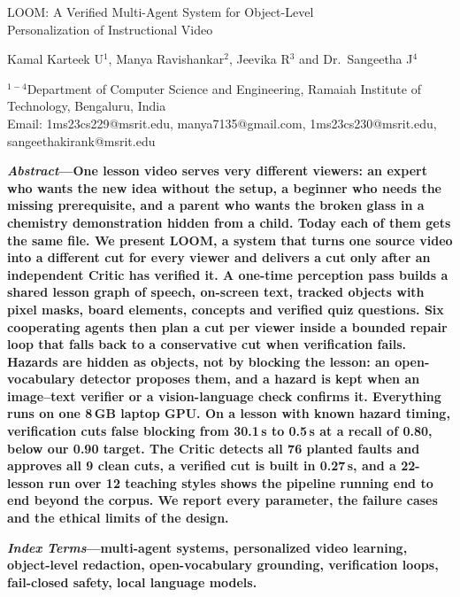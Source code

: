 \documentclass[9pt,a4paper]{extarticle}
\begin{document}
\begin{center}
{\fontsize{20}{24}\selectfont LOOM: A Verified Multi-Agent System for Object-Level\\ Personalization of Instructional Video\par}
\vspace{10pt}
{\fontsize{10}{12}\selectfont Kamal Karteek U$^1$, Manya Ravishankar$^2$, Jeevika R$^3$ and Dr.\ Sangeetha J$^4$\par}
\vspace{2pt}
{\fontsize{9}{11}\selectfont $^{1-4}$Department of Computer Science and Engineering, Ramaiah Institute of Technology, Bengaluru, India\\
Email: 1ms23cs229@msrit.edu, manya7135@gmail.com, 1ms23cs230@msrit.edu, sangeethakirank@msrit.edu\par}
\end{center}
\vspace{6pt}

\begin{list}{}{\leftmargin=1.1cm\rightmargin=1.1cm}\item\relax
\textbf{\textit{Abstract}---One lesson video serves very different viewers: an expert who wants the new idea without
the setup, a beginner who needs the missing prerequisite, and a parent who wants the broken glass in a chemistry
demonstration hidden from a child. Today each of them gets the same file. We present LOOM, a system that turns one
source video into a different cut for every viewer and delivers a cut only after an independent Critic has verified it.
A one-time perception pass builds a shared lesson graph of speech, on-screen text, tracked objects with pixel masks,
board elements, concepts and verified quiz questions. Six cooperating agents then plan a cut per viewer inside a
bounded repair loop that falls back to a conservative cut when verification fails. Hazards are hidden as objects, not
by blocking the lesson: an open-vocabulary detector proposes them, and a hazard is kept when an image--text verifier
or a vision-language check confirms it. Everything runs on one 8\,GB laptop GPU. On a lesson with known hazard timing,
verification cuts false blocking from 30.1\,s to 0.5\,s at a recall of 0.80, below our 0.90 target. The Critic detects
all 76 planted faults and approves all 9 clean cuts, a verified cut is built in 0.27\,s, and a 22-lesson run over 12
teaching styles shows the pipeline running end to end beyond the corpus. We report every parameter, the failure cases
and the ethical limits of the design.}

\vspace{6pt}
\textbf{\textit{Index Terms}---multi-agent systems, personalized video learning, object-level redaction,
open-vocabulary grounding, verification loops, fail-closed safety, local language models.}
\end{list}
\end{document}
